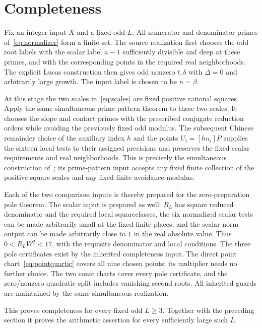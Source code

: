 \documentclass[11pt,a4paper]{article}
\begin{document}
\section{Completeness}

Fix an integer input $X$ and a fixed odd $L$. All numerator
and denominator primes of~\eqref{eq:normalizer} form a finite
set. The source realization first chooses the odd root labels
with the scalar label $a-1$ sufficiently divisible and deep at
these primes, and with the corresponding points in the required
real neighborhoods. The explicit Lucas construction then gives
odd nonzero $t,b$ with $\Delta=0$ and arbitrarily large
growth. The input label is chosen to be $n=\beta$.

At this stage the two scales in~\eqref{eq:scales} are fixed
positive rational squares. Apply the same simultaneous
prime-pattern theorem to these two scales. It chooses the slope
and contact primes with the prescribed conjugate reduction
orders while avoiding the previously fixed odd modulus. The
subsequent Chinese remainder choice of the auxiliary index $h$
and the points $U_i=[hn_i]P$ supplies the sixteen local tests
to their assigned precisions and preserves the fixed scalar
requirements and real neighborhoods. This is precisely the
simultaneous construction of~\cite{Dependencies,Baseline}; its
prime-pattern input accepts any fixed finite collection of the
positive square scales and any fixed finite avoidance modulus.

Each of the two comparison inputs is thereby prepared for the
zero-preparation pole theorem. The scalar input is prepared as
well: $R_L$ has square reduced denominator and the required
local squareclasses, the six normalized scalar tests can be made
arbitrarily small at the fixed finite places, and the scalar
norm output can be made arbitrarily close to $1$ in the real
absolute value. Thus $0<R_LW^2<17$, with the requisite
denominator and local conditions. The three pole certificates
exist by the inherited completeness input. The direct point chart~\eqref{eq:pointquartic} covers all nine
chosen points; its multiplier needs no further choice. The two conic charts
cover every pole certificate, and the zero/nonzero quadratic split
includes vanishing second roots. All inherited guards are
maintained by the same simultaneous realization.

This proves completeness for every fixed odd $L\ge3$.
Together with the preceding section it proves the arithmetic
assertion for every sufficiently large such $L$.
\end{document}
